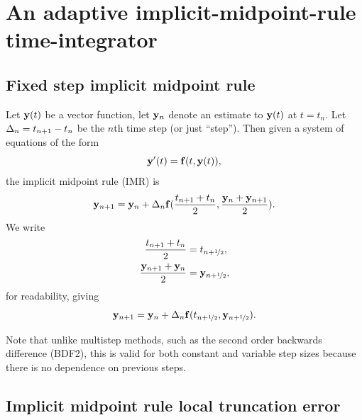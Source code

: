 

\chapter{An adaptive implicit-midpoint-rule time-integrator}




\section{Fixed step implicit midpoint rule}

Let $\mathbf{y}(t)$ be a vector function, let $\mathbf{y}_n$ denote an estimate to $\mathbf{y}(t)$ at $t = t_n$.
Let $\Delta_{n} = t_{n+1} - t_n$ be the $n$th time step (or just ``step'').
Then given a system of equations of the form
\begin{equation}
  \mathbf{y}'(t) = {\mathbf{f}}(t, \mathbf{y}(t)),
  \label{eq:43}
\end{equation}
the implicit midpoint rule (IMR) is
\begin{equation}
    \mathbf{y}_{n+1} = \mathbf{y}_n + \Delta_{n} {\mathbf{f}}(\frac{t_{n+1} + t_n}{2}, \frac{\mathbf{y}_n + \mathbf{y}_{n+1}}{2}).
    \notag
\end{equation}
We write
\begin{equation}
  \begin{aligned}
    \frac{t_{n+1} + t_n}{2} &= t_{n+\nicefrac{1}{2}}, \\
    \frac{\mathbf{y}_{n+1} + \mathbf{y}_n}{2} &= \mathbf{y}_{n+\nicefrac{1}{2}},
  \end{aligned}
\end{equation}
for readability, giving
\begin{equation}
  \mathbf{y}_{n+1} = \mathbf{y}_n + \Delta_{n} {\mathbf{f}}(t_{n+\nicefrac{1}{2}}, \mathbf{y}_{n+\nicefrac{1}{2}}).
  \label{eq:basic-midpoint}
\end{equation}

Note that unlike multistep methods, such as the second order backwards difference (BDF2), this is valid for both constant and variable step sizes because there is no dependence on previous steps.


\section{Implicit midpoint rule local truncation error}
\label{sec:deriv-local-trunc}

